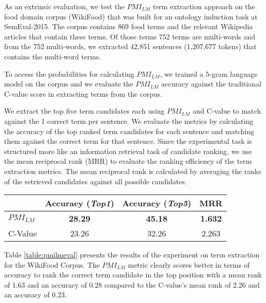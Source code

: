 As an extrinsic evaluation, we test the $PMI_{LM}$ term extraction approach on the food domain corpus (WikiFood) that was built for an ontology induction task at SemEval-2015. The corpus contains 869 food terms and the relevant Wikipedia articles that contain these terms. Of those terms 752 terms are multi-words and from the 752 multi-words, we extracted 42,851 sentences (1,207,677 tokens) that contains the multi-word terms. 

To access the probabilities for calculating ${ PMI }_{ LM }$, we trained a 5-gram language model on the corpus and we evaluate the ${ PMI }_{ LM }$ accuracy against the traditional C-value score in extracting terms from the corpus. 

We extract the top five term candidates each using ${ PMI }_{ LM }$ and C-value to match against the 1 correct term per sentence. We evaluate the metrics by calculating the accuracy of the top ranked term candidates for each sentence and matching them against the correct term for that sentence. Since the experimental task is structured more like an information retrieval task of candidate ranking, we use the mean reciprocal rank (MRR) to evaluate the ranking efficiency of the term extraction metrics. The mean reciprocal rank is calculated by averaging the ranks of the retrieved candidates against all possible candidates.

\begin{table*}[ht!]
\centering
    \begin{tabular}{l|cc|c}
    ~       & Accuracy (\textit{Top1}) & Accuracy (\textit{Top5}) & MRR   \\ \hline
    \textbf{$PMI_{LM}$}   & \textbf{28.29}           & \textbf{45.18}           & \textbf{1.632} \\
    C-Value & 23.26           & 32.26           & 2.263 \\
    \end{tabular}
\caption{Accuracy and Mean Reciprocal Rank for Term Extraction for WikiFood}
\label{table:pmilmeval}
\end{table*}

Table \ref{table:pmilmeval} presents the results of the experiment on term extraction for the WikiFood Corpus. The $PMI_{LM}$ metric clearly scores better in terms of accuracy to rank the correct term candidate in the top position with a mean rank of 1.63 and an accuracy of 0.28 compared to the C-value’s mean rank of 2.26 and an accuracy of 0.23.

